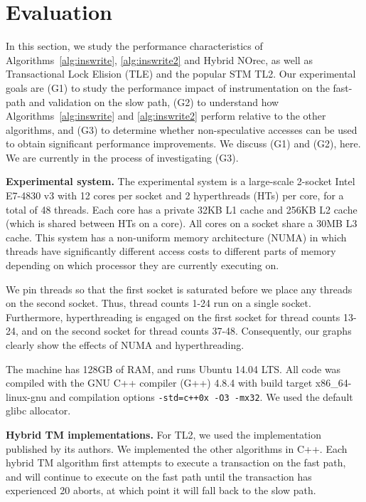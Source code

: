 \section{Evaluation}
\label{sec:eval}
%
In this section, we study the performance characteristics of Algorithms~\ref{alg:inswrite}, \ref{alg:inswrite2} and Hybrid NOrec, as well as Transactional Lock Elision (TLE) and the popular STM TL2.
Our experimental goals are (G1) to study the performance impact of instrumentation on the fast-path and validation on the slow path, (G2) to understand how Algorithms~\ref{alg:inswrite} and \ref{alg:inswrite2} perform relative to the other algorithms, and (G3) to determine whether non-speculative accesses can be used to obtain significant performance improvements.
We discuss (G1) and (G2), here.
We are currently in the process of investigating (G3).


\vspace{1mm}\noindent\textbf{Experimental system.}
The experimental system is a large-scale 2-socket Intel E7-4830 v3 with 12 cores per socket and 2 hyperthreads (HTs) per core, for a total of 48 threads.
Each core has a private 32KB L1 cache and 256KB L2 cache (which is shared between HTs on a core).
All cores on a socket share a 30MB L3 cache.
This system has a non-uniform memory architecture (NUMA) in which threads have significantly different access costs to different parts of memory depending on which processor they are currently executing on.

We pin threads so that the first socket is saturated before we place any threads on the second socket.
Thus, thread counts 1-24 run on a single socket.
Furthermore, hyperthreading is engaged on the first socket for thread counts 13-24, and on the second socket for thread counts 37-48.
Consequently, our graphs clearly show the effects of NUMA and hyperthreading.

The machine has 128GB of RAM, and runs Ubuntu 14.04 LTS.
All code was compiled with the GNU C++ compiler (G++) 4.8.4 with build target x86\_64-linux-gnu and compilation options \texttt{-std=c++0x -O3 -mx32}.
We used the default glibc allocator.

\vspace{1mm}\noindent\textbf{Hybrid TM implementations.}
For TL2, we used the implementation published by its authors.
We implemented the other algorithms in C++.
Each hybrid TM algorithm first attempts to execute a transaction on the fast path, and will continue to execute on the fast path until the transaction has experienced 20 aborts, at which point it will fall back to the slow path.

